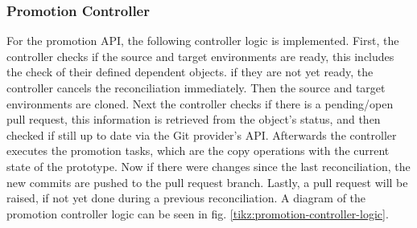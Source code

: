%	
%	
%	
%	
%	

\subsubsection*{Promotion Controller}

For the promotion API,
the following controller logic is implemented.
First, the controller checks if the source and target environments are ready,
this includes the check of their defined dependent objects.
if they are not yet ready, the controller cancels the reconciliation immediately.
Then the source and target environments are cloned.
Next the controller checks if there is a pending/open pull request,
this information is retrieved from the object's status, and then checked
if still up to date via the Git provider's API.
Afterwards the controller executes the promotion tasks,
which are the copy operations with the current state of the prototype.
Now if there were changes since the last reconciliation, the new commits
are pushed to the pull request branch.
Lastly, a pull request will be raised, if not yet done during a previous reconciliation.
A diagram of the promotion controller logic can be seen in fig. \ref{tikz:promotion-controller-logic}.

